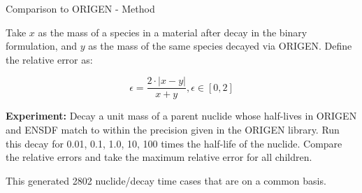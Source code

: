 \documentclass[xcolor=x11names,compress]{beamer}
\begin{document}
\begin{frame}{Comparison to ORIGEN - Method}

    Take $x$ as the mass of a species in a material 
    after decay in the binary formulation, and $y$ as the mass of the 
    same species decayed via ORIGEN. Define the relative error as:

    \vspace*{1em}
    \begin{equation}
    \epsilon = \frac{2 \cdot |x - y|}{x + y}, \epsilon \in [0, 2]
    \end{equation}

    \vspace*{1em}
    \textbf{Experiment:} Decay a unit mass of a parent
    nuclide whose half-lives 
    in ORIGEN and ENSDF match to within the precision given in the ORIGEN 
    library. Run this decay  for 0.01, 0.1, 1.0, 10, 100 times the half-life 
    of the nuclide. Compare the relative errors and take the maximum relative
    error for all children.

    \vspace*{1em}
    This generated 2802 nuclide/decay time cases that are on a common basis.

\end{frame}

\end{document}
